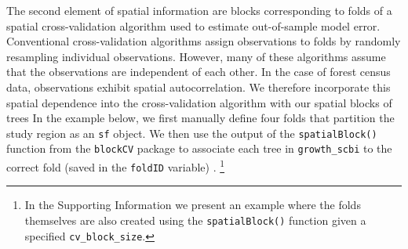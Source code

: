 \documentclass[12pt]{article}
\begin{document}
The second element of spatial information are blocks corresponding to
folds of a spatial cross-validation algorithm used to estimate
out-of-sample model error. Conventional cross-validation algorithms
assign observations to folds by randomly resampling individual
observations. However, many of these algorithms assume that the
observations are independent of each other. In the case of forest census
data, observations exhibit spatial autocorrelation. We therefore
incorporate this spatial dependence into the cross-validation algorithm
with our spatial blocks of trees \citep[
\citet{pohjankukka_estimating_2017}]{roberts_cross-validation_2017} In
the example below, we first manually define four folds that partition
the study region as an \texttt{sf} object. We then use the output of the
\texttt{spatialBlock()} function from the \texttt{blockCV} package to
associate each tree in \texttt{growth\_scbi} to the correct fold (saved
in the \texttt{foldID} variable) \citep{valavi_blockcv_2019}. \footnote{In
  the Supporting Information we present an example where the folds
  themselves are also created using the \texttt{spatialBlock()} function
  given a specified \texttt{cv\_block\_size}.}
\end{document}
